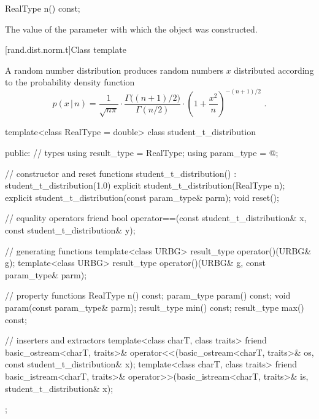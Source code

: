 %
\begin{itemdecl}
RealType n() const;
\end{itemdecl}

\begin{itemdescr}
\pnum
\returns
The value of the  parameter
 with which the object was constructed.
\end{itemdescr}


[rand.dist.norm.t]{Class template }%
%

\pnum
A  random number distribution
produces random numbers $x$
distributed according to
the probability density function%
\[ p(x\,|\,n) = \frac{1}{\sqrt{n \pi}}
     \cdot \frac{\Gamma\big((n+1)/2\big)}{\Gamma(n/2)}
     \cdot \left(1 + \frac{x^2}{n} \right)^{-(n+1)/2}
     \text{ .} \]

%
%
\begin{codeblock}
template<class RealType = double>
  class student_t_distribution {
  public:
    // types
    using result_type = RealType;
    using param_type  = @\unspec@;

    // constructor and reset functions
    student_t_distribution() : student_t_distribution(1.0) {}
    explicit student_t_distribution(RealType n);
    explicit student_t_distribution(const param_type& parm);
    void reset();

    // equality operators
    friend bool operator==(const student_t_distribution& x, const student_t_distribution& y);

    // generating functions
    template<class URBG>
      result_type operator()(URBG& g);
    template<class URBG>
      result_type operator()(URBG& g, const param_type& parm);

    // property functions
    RealType n() const;
    param_type param() const;
    void param(const param_type& parm);
    result_type min() const;
    result_type max() const;

    // inserters and extractors
    template<class charT, class traits>
      friend basic_ostream<charT, traits>&
        operator<<(basic_ostream<charT, traits>& os, const student_t_distribution& x);
    template<class charT, class traits>
      friend basic_istream<charT, traits>&
        operator>>(basic_istream<charT, traits>& is, student_t_distribution& x);
  };
\end{codeblock}

